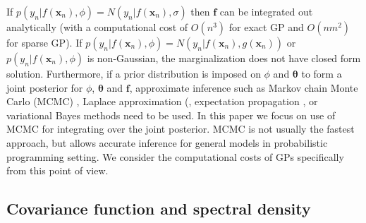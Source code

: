 \documentclass[onecolumn,a4paper,11pt]{article}
\begin{document}

If $p(y_n|f(\bm{x}_n),\phi)=N(y_n|f(\bm{x}_n),\sigma)$ then $\bm{f}$ can be integrated out analytically (with a computational cost of $O(n^3)$ for exact GP and $O(nm^2)$ for sparse GP). If $p(y_n|f(\bm{x}_n),\phi)=N(y_n|f(\bm{x}_n),g(\bm{x}_n))$ or $p(y_n|f(\bm{x}_n),\phi)$ is non-Gaussian, the marginalization does not have closed form solution. Furthermore, if a prior distribution is imposed on $\phi$ and $\bm{\theta}$ to form a joint posterior for $\phi$, $\bm{\theta}$ and $\bm{f}$, approximate inference such as Markov chain Monte Carlo (MCMC) \citep{brooks_2011}, Laplace approximation (\citep{williams1998bayesian,rasmussen2006gaussian}, expectation propagation \citep{minka2001expectation}, or variational Bayes methods \citep{gibbs2000variational,csato2000efficient} need to be used. In this paper we focus on use of MCMC for integrating over the joint
posterior. MCMC is not usually the fastest approach, but allows
accurate inference for general models in probabilistic programming
setting. We consider the computational costs of GPs specifically from
this point of view.

\subsection{Covariance function and spectral density}\label{ch4_sec_cov}
\end{document}
